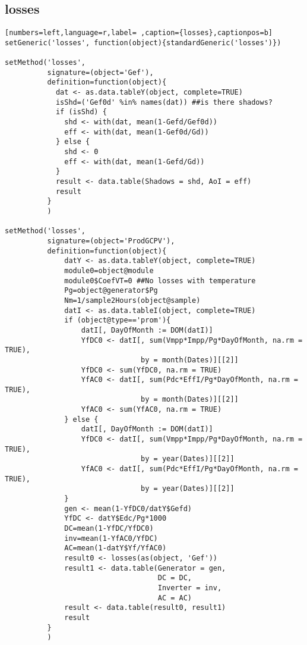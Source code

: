 \subsection{losses}
\label{sec:orge6b3ecd}
\begin{lstlisting}[numbers=left,language=r,label= ,caption={losses},captionpos=b]
setGeneric('losses', function(object){standardGeneric('losses')})

setMethod('losses',
          signature=(object='Gef'),
          definition=function(object){
            dat <- as.data.tableY(object, complete=TRUE)
            isShd=('Gef0d' %in% names(dat)) ##is there shadows?
            if (isShd) {
              shd <- with(dat, mean(1-Gefd/Gef0d))
              eff <- with(dat, mean(1-Gef0d/Gd))
            } else {
              shd <- 0
              eff <- with(dat, mean(1-Gefd/Gd))
            }
            result <- data.table(Shadows = shd, AoI = eff)
            result
          }
          )

setMethod('losses',
          signature=(object='ProdGCPV'),
          definition=function(object){
              datY <- as.data.tableY(object, complete=TRUE)
              module0=object@module
              module0$CoefVT=0 ##No losses with temperature
              Pg=object@generator$Pg
              Nm=1/sample2Hours(object@sample)
              datI <- as.data.tableI(object, complete=TRUE)
              if (object@type=='prom'){
                  datI[, DayOfMonth := DOM(datI)]
                  YfDC0 <- datI[, sum(Vmpp*Impp/Pg*DayOfMonth, na.rm = TRUE),
                                by = month(Dates)][[2]]
                  YfDC0 <- sum(YfDC0, na.rm = TRUE)
                  YfAC0 <- datI[, sum(Pdc*EffI/Pg*DayOfMonth, na.rm = TRUE),
                                by = month(Dates)][[2]]
                  YfAC0 <- sum(YfAC0, na.rm = TRUE)
              } else {
                  datI[, DayOfMonth := DOM(datI)]
                  YfDC0 <- datI[, sum(Vmpp*Impp/Pg*DayOfMonth, na.rm = TRUE),
                                by = year(Dates)][[2]]
                  YfAC0 <- datI[, sum(Pdc*EffI/Pg*DayOfMonth, na.rm = TRUE),
                                by = year(Dates)][[2]]     
              }
              gen <- mean(1-YfDC0/datY$Gefd)
              YfDC <- datY$Edc/Pg*1000
              DC=mean(1-YfDC/YfDC0)
              inv=mean(1-YfAC0/YfDC)
              AC=mean(1-datY$Yf/YfAC0)
              result0 <- losses(as(object, 'Gef'))
              result1 <- data.table(Generator = gen,
                                    DC = DC,
                                    Inverter = inv,
                                    AC = AC)
              result <- data.table(result0, result1)
              result
          }
          )


\end{lstlisting}
